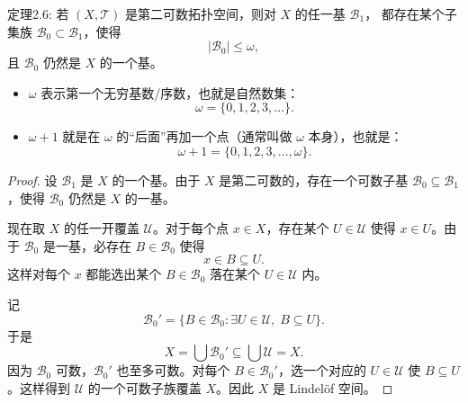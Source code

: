 \begin{theorem}定理2.6:
若 $(X,\mathcal{T})$ 是第二可数拓扑空间，则对 $X$ 的任一基 $\mathcal{B}_1$，
都存在某个子集族 $\mathcal{B}_0 \subset \mathcal{B}_1$，使得
\[
|\mathcal{B}_0| \leq \omega,
\]
且 $\mathcal{B}_0$ 仍然是 $X$ 的一个基。
\end{theorem}
\begin{itemize}
  \item $\omega$ 表示第一个无穷基数/序数，也就是自然数集：
  \[
    \omega = \{0,1,2,3,\dots\}.
  \]

  \item $\omega+1$ 就是在 $\omega$ 的“后面”再加一个点（通常叫做 $\omega$ 本身），也就是：
  \[
    \omega+1 = \{0,1,2,3,\dots,\omega\}.
  \]
\end{itemize}
\begin{proof}
设 $\mathcal{B}_1$ 是 $X$ 的一个基。由于 $X$ 是第二可数的，存在一个可数子基 $\mathcal{B}_0 \subseteq \mathcal{B}_1$，使得 $\mathcal{B}_0$ 仍然是 $X$ 的一基。

现在取 $X$ 的任一开覆盖 $\mathcal{U}$。对于每个点 $x\in X$，存在某个 $U\in\mathcal{U}$ 使得 $x\in U$。由于 $\mathcal{B}_0$ 是一基，必存在 $B\in \mathcal{B}_0$ 使得
\[
x \in B \subseteq U.
\]
这样对每个 $x$ 都能选出某个 $B\in\mathcal{B}_0$ 落在某个 $U\in\mathcal{U}$ 内。

记
\[
\mathcal{B}_0'=\{B\in\mathcal{B}_0:\exists U\in\mathcal{U},\; B\subseteq U\}.
\]
于是
\[
X=\bigcup \mathcal{B}_0'\subseteq \bigcup \mathcal{U}=X.
\]
因为 $\mathcal{B}_0$ 可数，$\mathcal{B}_0'$ 也至多可数。对每个 $B\in \mathcal{B}_0'$，选一个对应的 $U\in \mathcal{U}$ 使 $B\subseteq U$。这样得到 $\mathcal{U}$ 的一个可数子族覆盖 $X$。因此 $X$ 是 Lindel\"of 空间。
\end{proof}
